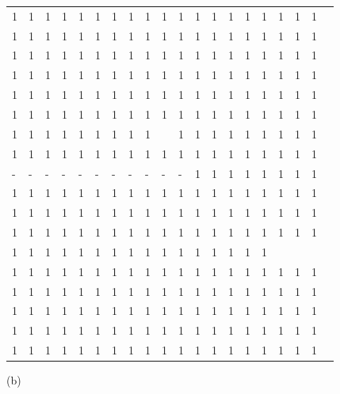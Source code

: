 \documentclass[10pt]{article}
\begin{document}
\begin{center}
\begin{tabular}{|llllllllllllllllllll}
\hline
1 & 1 & 1 & 1 & 1 & 1 & 1 & 1 & 1 & 1 & 1 & 1 & 1 & 1 & 1 & 1 & 1 & 1 & 1 \\
1 & 1 & 1 & 1 & 1 & 1 & 1 & 1 & 1 & 1 & 1 & 1 & 1 & 1 & 1 & 1 & 1 & 1 & 1 \\
1 & 1 & 1 & 1 & 1 & 1 & 1 & 1 & 1 & 1 & 1 & 1 & 1 & 1 & 1 & 1 & 1 & 1 & 1 \\
1 & 1 & 1 & 1 & 1 & 1 & 1 & 1 & 1 & 1 & 1 & 1 & 1 & 1 & 1 & 1 & 1 & 1 & 1 \\
1 & 1 & 1 & 1 & 1 & 1 & 1 & 1 & 1 & 1 & 1 & 1 & 1 & 1 & 1 & 1 & 1 & 1 & 1 \\
\hline
1 & 1 & 1 & 1 & 1 & 1 & 1 & 1 & 1 & 1 & 1 & 1 & 1 & 1 & 1 & 1 & 1 & 1 & 1 \\
1 & 1 & 1 & 1 & 1 & 1 & 1 & 1 & 1 &  & 1 & 1 & 1 & 1 & 1 & 1 & 1 & 1 & 1 \\
1 & 1 & 1 & 1 & 1 & 1 & 1 & 1 & 1 & 1 & 1 & 1 & 1 & 1 & 1 & 1 & 1 & 1 & 1 \\
- & - & - & - & - & - & - & - & - & - & - & 1 & 1 & 1 & 1 & 1 & 1 & 1 & 1 \\
1 & 1 & 1 & 1 & 1 & 1 & 1 & 1 & 1 & 1 & 1 & 1 & 1 & 1 & 1 & 1 & 1 & 1 & 1 \\
1 & 1 & 1 & 1 & 1 & 1 & 1 & 1 & 1 & 1 & 1 & 1 & 1 & 1 & 1 & 1 & 1 & 1 & 1 \\
1 & 1 & 1 & 1 & 1 & 1 & 1 & 1 & 1 & 1 & 1 & 1 & 1 & 1 & 1 & 1 & 1 & 1 & 1 \\
1 & 1 & 1 & 1 & 1 & 1 & 1 & 1 & 1 & 1 & 1 & 1 & 1 & 1 & 1 & 1 &  &  &  \\
1 & 1 & 1 & 1 & 1 & 1 & 1 & 1 & 1 & 1 & 1 & 1 & 1 & 1 & 1 & 1 & 1 & 1 & 1 \\
1 & 1 & 1 & 1 & 1 & 1 & 1 & 1 & 1 & 1 & 1 & 1 & 1 & 1 & 1 & 1 & 1 & 1 & 1 \\
1 & 1 & 1 & 1 & 1 & 1 & 1 & 1 & 1 & 1 & 1 & 1 & 1 & 1 & 1 & 1 & 1 & 1 & 1 \\
1 & 1 & 1 & 1 & 1 & 1 & 1 & 1 & 1 & 1 & 1 & 1 & 1 & 1 & 1 & 1 & 1 & 1 & 1 \\
1 & 1 & 1 & 1 & 1 & 1 & 1 & 1 & 1 & 1 & 1 & 1 & 1 & 1 & 1 & 1 & 1 & 1 & 1 \\
\hline
\end{tabular}
\end{center}

(b)
\end{document}
